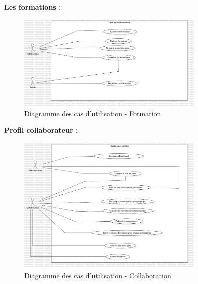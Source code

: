 \documentclass{article}
\begin{document}
                \FloatBarrier
                
                \textbf{Les formations :}
                \begin{figure}[h!]
                    \centering
                    \includegraphics[width=0.8\textwidth]{assets/diagrammes/jpg/Model4!UseCaseFormation_3.jpg}
                    \caption{Diagramme des cas d'utilisation - Formation}
                \end{figure}
                
                \FloatBarrier
                \newpage
                \textbf{Profil collaborateur :}
                \begin{figure}[h!]
                    \centering
                    \includegraphics[width=0.8\textwidth]{assets/diagrammes/jpg/Model5!UseCaseCollab_4.jpg}
                    \caption{Diagramme des cas d'utilisation - Collaboration}
                \end{figure}
                \FloatBarrier
                
\end{document}
